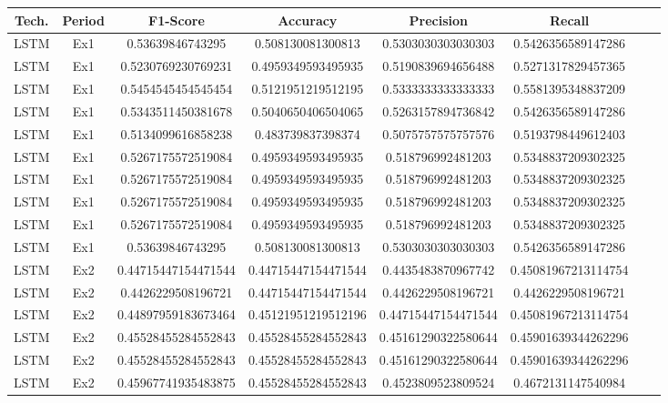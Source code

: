 \begin{appendices}
\thispagestyle{empty}


\begin{table}[H]
\scriptsize
\setlength\extrarowheight{3pt}
\centering
\caption{Resultados categóricos de todos os experimentos para os testes com o LSTM. Ações PETR4.SA.}
\begin{longtable}{ccccccll}
\hline
Tech. & Period & F1-Score & Accuracy & Precision & Recall \\ \hline
LSTM & Ex1 & 0.53639846743295 & 0.508130081300813 & 0.5303030303030303 & 0.5426356589147286 \\
LSTM & Ex1 & 0.5230769230769231 & 0.4959349593495935 & 0.5190839694656488 & 0.5271317829457365 \\
LSTM & Ex1 & 0.5454545454545454 & 0.5121951219512195 & 0.5333333333333333 & 0.5581395348837209 \\
LSTM & Ex1 & 0.5343511450381678 & 0.5040650406504065 & 0.5263157894736842 & 0.5426356589147286 \\
LSTM & Ex1 & 0.5134099616858238 & 0.483739837398374 & 0.5075757575757576 & 0.5193798449612403 \\
LSTM & Ex1 & 0.5267175572519084 & 0.4959349593495935 & 0.518796992481203 & 0.5348837209302325 \\
LSTM & Ex1 & 0.5267175572519084 & 0.4959349593495935 & 0.518796992481203 & 0.5348837209302325 \\
LSTM & Ex1 & 0.5267175572519084 & 0.4959349593495935 & 0.518796992481203 & 0.5348837209302325 \\
LSTM & Ex1 & 0.5267175572519084 & 0.4959349593495935 & 0.518796992481203 & 0.5348837209302325 \\
LSTM & Ex1 & 0.53639846743295 & 0.508130081300813 & 0.5303030303030303 & 0.5426356589147286 \\
LSTM & Ex2 & 0.44715447154471544 & 0.44715447154471544 & 0.4435483870967742 & 0.45081967213114754 \\
LSTM & Ex2 & 0.4426229508196721 & 0.44715447154471544 & 0.4426229508196721 & 0.4426229508196721 \\
LSTM & Ex2 & 0.44897959183673464 & 0.45121951219512196 & 0.44715447154471544 & 0.45081967213114754 \\
LSTM & Ex2 & 0.45528455284552843 & 0.45528455284552843 & 0.45161290322580644 & 0.45901639344262296 \\
LSTM & Ex2 & 0.45528455284552843 & 0.45528455284552843 & 0.45161290322580644 & 0.45901639344262296 \\
LSTM & Ex2 & 0.45967741935483875 & 0.45528455284552843 & 0.4523809523809524 & 0.4672131147540984 \\

\end{longtable}
\end{table}
\end{appendices}
